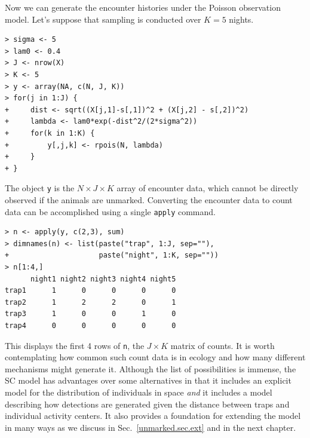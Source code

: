 Now we can generate the encounter histories under the
Poisson observation model. Let's suppose that sampling is conducted
over $K=5$ nights.
\begin{small}
\begin{verbatim}
> sigma <- 5
> lam0 <- 0.4
> J <- nrow(X)
> K <- 5
> y <- array(NA, c(N, J, K))
> for(j in 1:J) {
+     dist <- sqrt((X[j,1]-s[,1])^2 + (X[j,2] - s[,2])^2)
+     lambda <- lam0*exp(-dist^2/(2*sigma^2))
+     for(k in 1:K) {
+         y[,j,k] <- rpois(N, lambda)
+     }
+ }
\end{verbatim}
\end{small}
The object \verb+y+ is the $N \times J \times K$ array of encounter
data, which cannot be directly observed if the animals are unmarked.
Converting the encounter data to count data can be accomplished using a single
\verb+apply+ command.
\begin{small}
\begin{verbatim}
> n <- apply(y, c(2,3), sum)
> dimnames(n) <- list(paste("trap", 1:J, sep=""),
+                     paste("night", 1:K, sep=""))
> n[1:4,]
      night1 night2 night3 night4 night5
trap1      1      0      0      0      0
trap2      1      2      2      0      1
trap3      1      0      0      1      0
trap4      0      0      0      0      0
\end{verbatim}
\end{small}
This displays the first 4 rows of \verb+n+, the $J \times K$
matrix of counts.
It is worth contemplating how common such count data
is in
ecology and how many different mechanisms might generate it. Although
the list of possibilities is immense, the SC model has advantages over
some alternatives
in that it includes an explicit
model for the distribution of individuals in space \textit{and} it
includes a model describing how detections are generated given the
distance between traps and individual activity centers. It also
provides a foundation for extending the model in many ways as we
discuss in Sec.~\ref{unmarked.sec.ext} and in the next chapter.

